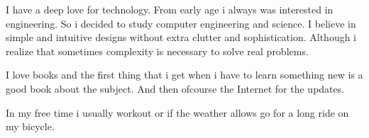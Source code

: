\documentclass[margin, 10pt]{res} %
\begin{document}
\begin{resume}
I have a deep love for technology.
From early age i always was interested in engineering.
So i decided to study computer engineering and science.
I believe in simple and intuitive designs without extra clutter and sophistication.
Although i realize that sometimes complexity is necessary to solve real problems.

I love books and the first thing that i get when i have to learn something new is a good book about the subject. And then ofcourse the Internet for the updates.

In my free time i usually workout or if the weather allows go for a long ride on my bicycle.

 


\end{resume}
\end{document}
